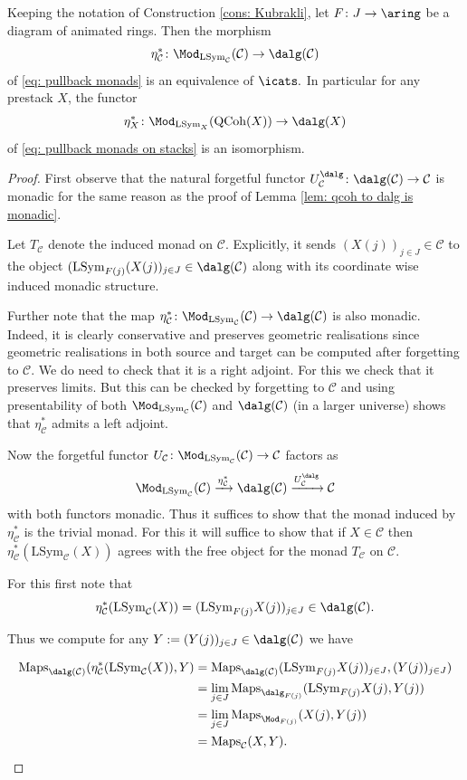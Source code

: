 \documentclass[10pt,reqno]{amsart}
\numberwithin{equation}{section}
\newcommand{\cC}{\mathcal{C}}
\newcommand{\Maps}{\mathrm{Maps}}
\newcommand{\Qcoh}{\mathrm{QCoh}}
\newcommand{\Sym}{\mathrm{Sym}}
\renewcommand{\L}{\mathrm{L}}
\begin{document}
\begin{proposition}\label{prop: kubrak prop}
   Keeping the notation of Construction \ref{cons: Kubrakli}, let $F\colon J\to \aring$ be a diagram of animated rings. Then the morphism $$\eta^*_{\cC}\colon \Mod_{\L\Sym_{\cC}}(\cC)\to \dalg(\cC)$$ of \ref{eq: pullback monads} is an equivalence of $\icats.$
   In particular for any prestack $X$, the functor $$\eta_X^*\colon  \Mod_{\L\Sym_X}(\Qcoh(X))\to \dalg(X)$$ of \ref{eq: pullback monads on stacks} is an isomorphism.
\end{proposition}

\begin{proof}
    First observe that the natural forgetful functor $U^{\dalg}_{\cC}\colon \dalg(\cC)\to \cC$ is monadic for the same reason as the proof of Lemma \ref{lem: qcoh to dalg is monadic}. 
    
    Let $T_{\cC}$ denote the induced monad on $\cC.$ Explicitly, it sends $(X(j))_{j\in J}\in \cC$ to the object $(\L\Sym_{F(j)}(X(j))_{j\in J}\in \dalg(\cC)$ along with its coordinate wise induced monadic structure.

    
   Further note that the map $\eta^*_{\cC}\colon \Mod_{\L\Sym_{\cC}}(\cC)\to \dalg(\cC)$ is also monadic. Indeed, it is clearly conservative and preserves geometric realisations since geometric realisations in both source and target can be computed after forgetting to $\cC.$ We do need to check that it is a right adjoint. For this we check that it preserves limits. But this can be checked by forgetting to $\cC$ and using presentability of both $\Mod_{\L\Sym_{\cC}}(\cC)$ and $\dalg(\cC)$ (in a larger universe) shows that $\eta^*_{\cC}$ admits a left adjoint.

    Now the forgetful functor $U_\cC\colon \Mod_{\L\Sym_{\cC}}(\cC)\to \cC$ factors as $$\Mod_{\L\Sym_{\cC}}(\cC)\xrightarrow{\eta_{\cC}^*}\dalg(\cC)\xrightarrow{U_{\cC}^\dalg}\cC$$ with both functors monadic. 
    Thus it suffices to show that the monad induced by $\eta_{\cC}^*$ is the trivial monad. For this it will suffice to show that if $X\in \cC$ then  $\eta_{\cC}^*(\L\Sym_{\cC}(X))$ agrees with the free object for the monad $T_\cC$ on $\cC$. 

    For this first note that $$\eta_{\cC}^*(\L\Sym_{\cC}(X))=(\L\Sym_{F(j)}X(j))_{j\in J}\in \dalg(\cC).$$

    Thus we compute for any $Y:=(Y(j))_{j\in J}\in \dalg(\cC)$ we have

    \begin{align*}
        \Maps_{\dalg(\cC)}(\eta_{\cC}^*(\L\Sym_{\cC}(X)),Y) &=\Maps_{\dalg(\cC)}(\L\Sym_{F(j)}X(j))_{j\in J}, (Y(j))_{j\in J})\\
        &=\lim_{j\in J}\Maps_{\dalg_{F(j)}}(\L\Sym_{F(j)}X(j), Y(j))\\
        &=\lim_{j\in J}\Maps_{\Mod_{F(j)}}(X(j), Y(j))\\
        &=\Maps_{\cC}(X,Y).
    \end{align*}

    

\end{proof}








\end{document}
